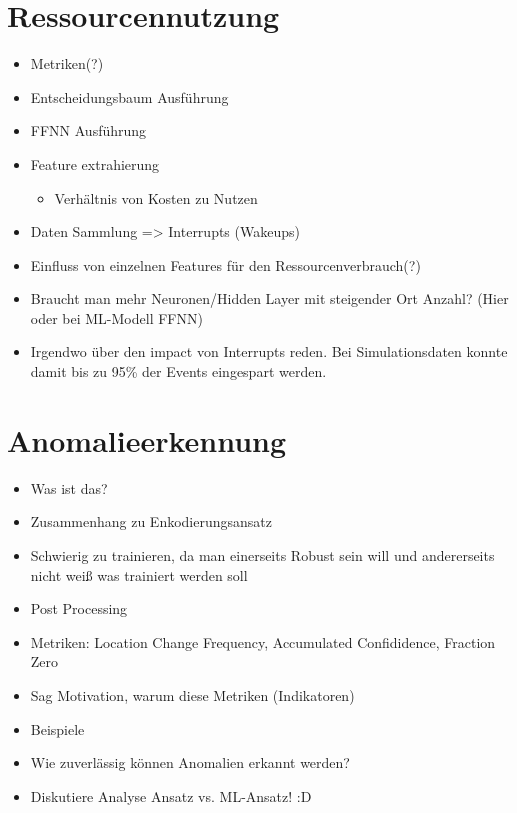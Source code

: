 \section{Ressourcennutzung}
\begin{itemize}
    \item Metriken(?)
    \item Entscheidungsbaum Ausführung
    \item FFNN Ausführung
    \item Feature extrahierung
    \begin{itemize}
        \item Verhältnis von Kosten zu Nutzen
    \end{itemize}
    \item Daten Sammlung => Interrupts (Wakeups)
    \item Einfluss von einzelnen Features für den Ressourcenverbrauch(?)
    \item Braucht man mehr Neuronen/Hidden Layer mit steigender Ort Anzahl? (Hier oder bei ML-Modell FFNN)
    \item Irgendwo über den impact von Interrupts reden. Bei Simulationsdaten konnte damit bis zu 95\% der Events eingespart werden.
\end{itemize}

\section{Anomalieerkennung}
\label{sec:eval_anomalieerkennung}
\begin{itemize}
    \item Was ist das?
    \item Zusammenhang zu Enkodierungsansatz
    \item Schwierig zu trainieren, da man einerseits Robust sein will und andererseits nicht weiß was trainiert werden soll
    \item Post Processing
    \item Metriken: Location Change Frequency, Accumulated Confididence, Fraction Zero
    \item Sag Motivation, warum diese Metriken (Indikatoren)
    \item Beispiele
    \item Wie zuverlässig können Anomalien erkannt werden?
    \item Diskutiere Analyse Ansatz vs. ML-Ansatz! :D
\end{itemize}